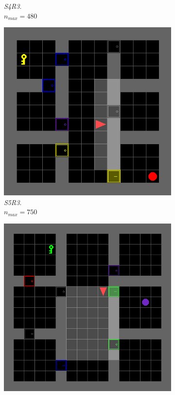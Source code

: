 \documentclass{article}
\begin{document}
\begin{figure}[H]
\begin{subfigure}[b]{0.32\linewidth}
    \caption{\textit{S4R3}.
    \\ \(n_{max}=480 \)}
  \end{subfigure}
  \hfill
  \begin{subfigure}[b]{0.32\linewidth}
    \centering
    \includegraphics[width=\linewidth]{Tasks/KeyCorridor/S5R3}
    \caption{\textit{S5R3}. \\
    \(n_{max}=750\)}
  \end{subfigure}
  \hfill
  \begin{subfigure}[b]{0.32\linewidth}
    \centering
    \includegraphics[width=\linewidth]{Tasks/KeyCorridor/S6R3}

\end{subfigure}
\end{figure}
\end{document}
